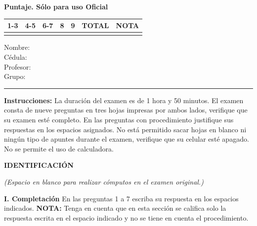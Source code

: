 \documentclass[11pt]{article}
\begin{document}
\examheader

\vspace{4pt}
\noindent
\begin{minipage}[t]{0.56\linewidth}
\textbf{Puntaje. Sólo para uso Oficial}\\[4pt]
\begin{tabular}{|c|c|c|c|c|c|c|}
\hline
1-3 & 4-5 & 6-7 & 8 & 9 & \textbf{TOTAL} & \textbf{NOTA} \\ \hline
 & & & & & & \\ \hline
\end{tabular}
\end{minipage}%
\hfill
\begin{minipage}[t]{0.4\linewidth}
Nombre: \dotfill\\[6pt]
Cédula: \dotfill\\[6pt]
Profesor: \dotfill\\[6pt]
Grupo: \dotfill
\end{minipage}
\vspace{6pt}\par
\noindent\rule{\linewidth}{0.4pt}

\vspace{6pt}
\noindent\textbf{Instrucciones:} La duración del examen es de 1 hora y 50 minutos. El examen consta de nueve preguntas en tres hojas impresas por ambos lados, verifique que su examen esté completo. En las preguntas con procedimiento justifique sus respuestas en los espacios asignados. No está permitido sacar hojas en blanco ni ningún tipo de apuntes durante el examen, verifique que su celular esté apagado. No se permite el uso de calculadora.

\vspace{6pt}
\noindent\textbf{IDENTIFICACIÓN}

\vspace{4pt}
\noindent\textit{(Espacio en blanco para realizar cómputos en el examen original.)}

\vspace{10pt}
\noindent\textbf{I. Completación} En las preguntas 1 a 7 escriba su respuesta en los espacios indicados. \textbf{NOTA:} Tenga en cuenta que en esta sección se califica solo la respuesta escrita en el espacio indicado y no se tiene en cuenta el procedimiento.
\end{document}
